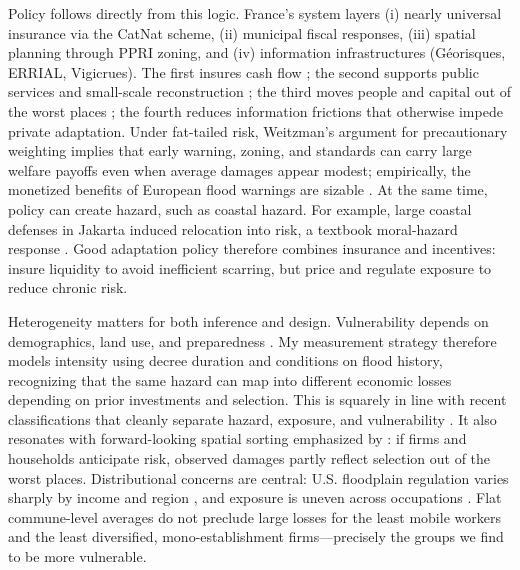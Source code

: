 Policy follows directly from this logic. France’s system layers (i) nearly universal insurance via the CatNat scheme, (ii) municipal fiscal responses, (iii) spatial planning through PPRI zoning, and (iv) information infrastructures (Géorisques, ERRIAL, Vigicrues). The first insures cash flow \citep{grislain2018natural}; the second supports public services and small-scale reconstruction \citep{morvan2022municipalities}; the third moves people and capital out of the worst places \citep{CHELLE20251}; the fourth reduces information frictions that otherwise impede private adaptation. Under fat-tailed risk, Weitzman’s argument for precautionary weighting implies that early warning, zoning, and standards can carry large welfare payoffs even when average damages appear modest; empirically, the monetized benefits of European flood warnings are sizable \citep{pappenberger2015monetary}. At the same time, policy can create hazard, such as coastal hazard. For example, large coastal defenses in Jakarta induced relocation into risk, a textbook moral-hazard response \citep{hsiao2023sea}. Good adaptation policy therefore combines insurance and incentives: insure liquidity to avoid inefficient scarring, but price and regulate exposure to reduce chronic risk.

Heterogeneity matters for both inference and design. Vulnerability depends on demographics, land use, and preparedness \citep{boissier2013mortalite,papagiannaki2022developing}. My measurement strategy therefore models intensity using decree duration and conditions on flood history, recognizing that the same hazard can map into different economic losses depending on prior investments and selection. This is squarely in line with recent classifications that cleanly separate hazard, exposure, and vulnerability \citep{kreibich2022challenge}. It also resonates with forward-looking spatial sorting emphasized by \cite{bilal2023anticipating}: if firms and households anticipate risk, observed damages partly reflect selection out of the worst places. Distributional concerns are central: U.S. floodplain regulation varies sharply by income and region \citep{Cano2024Exposing}, and exposure is uneven across occupations \citep{reynier2024distributional}. Flat commune-level averages do not preclude large losses for the least mobile workers and the least diversified, mono-establishment firms—precisely the groups we find to be more vulnerable.

